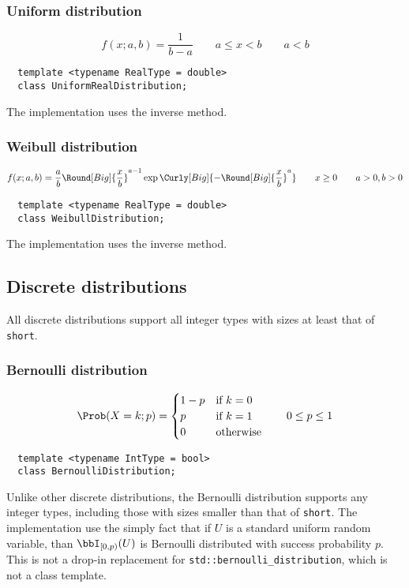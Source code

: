 \subsubsection{Uniform distribution}

\begin{equation*}
  f(x;a,b) = \frac{1}{b - a}
  \qquad a \le x < b
  \qquad a < b
\end{equation*}
\begin{Verbatim}
  template <typename RealType = double>
  class UniformRealDistribution;
\end{Verbatim}
The implementation uses the inverse method.

\subsubsection{Weibull distribution}

\begin{equation*}
  f(x;a,b) = \frac{a}{b}\Round[Big]{\frac{x}{b}}^{a - 1}
  \exp\Curly[Big]{-\Round[Big]{\frac{x}{b}}^a}
  \qquad x \ge 0
  \qquad a > 0, b > 0
\end{equation*}
\begin{Verbatim}
  template <typename RealType = double>
  class WeibullDistribution;
\end{Verbatim}
The implementation uses the inverse method.

\subsection{Discrete distributions}
\label{sub:Discrete distributions}

All discrete distributions support all integer types with sizes at least that
of \verb|short|.

\subsubsection{Bernoulli distribution}

\begin{equation*}
  \Prob(X = k;p) = \begin{cases}
    1 - p &\text{if } k = 0\\
    p     &\text{if } k = 1 \\
    0     &\text{otherwise}
  \end{cases}
  \qquad 0 \le p \le 1
\end{equation*}
\begin{Verbatim}
  template <typename IntType = bool>
  class BernoulliDistribution;
\end{Verbatim}
Unlike other discrete distributions, the Bernoulli distribution supports any
integer types, including those with sizes smaller than that of \verb|short|.
The implementation use the simply fact that if $U$ is a standard uniform random
variable, than $\bbI_{[0,p)}(U)$ is Bernoulli distributed with success
probability $p$. This is not a drop-in replacement for
\verb|std::bernoulli_distribution|, which is not a class template.

